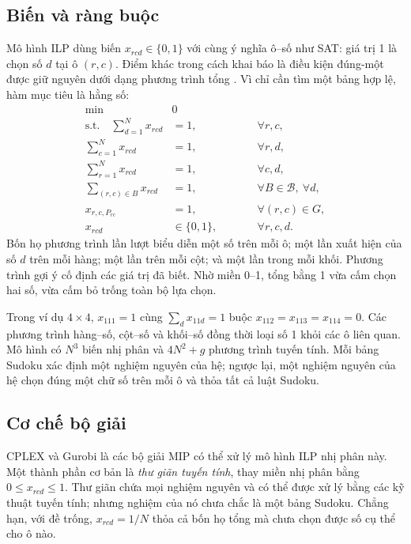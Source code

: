 \documentclass[a4paper]{cas-sc}
\begin{document}
\subsection{Biến và ràng buộc}
Mô hình ILP dùng biến $x_{rcd}\in\{0,1\}$ với cùng ý nghĩa ô--số như SAT: giá trị 1 là chọn số $d$ tại ô $(r,c)$. Điểm khác trong cách khai báo là điều kiện đúng-một được giữ nguyên dưới dạng phương trình tổng \citep{gurobiSudoku}. Vì chỉ cần tìm một bảng hợp lệ, hàm mục tiêu là hằng số:
\begin{equation}\label{eq:mip}
\begin{alignedat}{2}
\min\quad &0 &\qquad&\\
\text{s.t.}\quad\sum_{d=1}^{N}x_{rcd}&=1, &&\forall r,c,\\
\sum_{c=1}^{N}x_{rcd}&=1, &&\forall r,d,\\
\sum_{r=1}^{N}x_{rcd}&=1, &&\forall c,d,\\
\sum_{(r,c)\in B}x_{rcd}&=1, &&\forall B\in\mathcal B,\ \forall d,\\
x_{r,c,P_{rc}}&=1, &&\forall(r,c)\in G,\\
x_{rcd}&\in\{0,1\}, &&\forall r,c,d.
\end{alignedat}
\end{equation}
Bốn họ phương trình lần lượt biểu diễn một số trên mỗi ô; một lần xuất hiện của số $d$ trên mỗi hàng; một lần trên mỗi cột; và một lần trong mỗi khối. Phương trình gợi ý cố định các giá trị đã biết. Nhờ miền 0--1, tổng bằng 1 vừa cấm chọn hai số, vừa cấm bỏ trống toàn bộ lựa chọn.

Trong ví dụ $4\times4$, $x_{111}=1$ cùng $\sum_d x_{11d}=1$ buộc $x_{112}=x_{113}=x_{114}=0$. Các phương trình hàng--số, cột--số và khối--số đồng thời loại số 1 khỏi các ô liên quan. Mô hình có $N^3$ biến nhị phân và $4N^2+g$ phương trình tuyến tính. Mỗi bảng Sudoku xác định một nghiệm nguyên của hệ; ngược lại, một nghiệm nguyên của hệ chọn đúng một chữ số trên mỗi ô và thỏa tất cả luật Sudoku.

\subsection{Cơ chế bộ giải}
CPLEX và Gurobi là các bộ giải MIP có thể xử lý mô hình ILP nhị phân này. Một thành phần cơ bản là \emph{thư giãn tuyến tính}, thay miền nhị phân bằng $0\le x_{rcd}\le1$. Thư giãn chứa mọi nghiệm nguyên và có thể được xử lý bằng các kỹ thuật tuyến tính; nhưng nghiệm của nó chưa chắc là một bảng Sudoku. Chẳng hạn, với đề trống, $x_{rcd}=1/N$ thỏa cả bốn họ tổng mà chưa chọn được số cụ thể cho ô nào.
\end{document}

